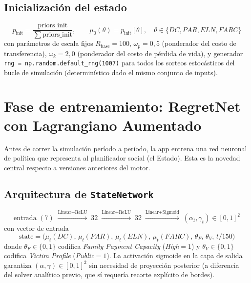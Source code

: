 \documentclass[ecta,nameyear,draft]{econsocart}
\newcommand{\pyvar}[1]{\texttt{#1}}
\begin{document}
\subsection{Inicialización del estado}

\begin{equation}
p_{\mathrm{init}} = \frac{\mathrm{priors\_init}}{\sum \mathrm{priors\_init}},
\qquad
\mu_0(\theta) = p_{\mathrm{init}}[\theta], \quad \theta \in \{DC, PAR, ELN, FARC\}
\end{equation}
con parámetros de escala fijos $R_{\mathrm{base}}=100$, $\omega_p = 0{,}5$ (ponderador del
costo de transferencia), $\omega_k = 2{,}0$ (ponderador del costo de pérdida de vida), y
generador \texttt{rng = np.random.default\_rng(1007)} para todos los sorteos estocásticos del
bucle de simulación (determinístico dado el mismo conjunto de inputs).

\section{Fase de entrenamiento: RegretNet con Lagrangiano Aumentado}\label{sec:training}

Antes de correr la simulación período a período, la app entrena una red neuronal de política
que representa al planificador social (el Estado). Esta es la novedad central respecto a
versiones anteriores del motor.

\subsection{Arquitectura de \pyvar{StateNetwork}}

\begin{equation}
\text{entrada } (7) \;\xrightarrow{\text{Linear+ReLU}}\; 32 \;\xrightarrow{\text{Linear+ReLU}}\; 32 \;\xrightarrow{\text{Linear+Sigmoid}}\; (\alpha_t, \gamma_t) \in [0,1]^2
\end{equation}
con vector de entrada
\begin{equation}
\text{state} = \bigl(\mu_t(DC),\, \mu_t(PAR),\, \mu_t(ELN),\, \mu_t(FARC),\, \theta_F,\, \theta_V,\, t/150\bigr)
\end{equation}
donde $\theta_F \in \{0,1\}$ codifica \emph{Family Payment Capacity} (\emph{High}$=1$) y
$\theta_V \in \{0,1\}$ codifica \emph{Victim Profile} (\emph{Public}$=1$). La activación
sigmoide en la capa de salida garantiza $(\alpha,\gamma) \in [0,1]^2$ sin necesidad de
proyección posterior (a diferencia del solver analítico previo, que sí requería recorte
explícito de bordes).
\end{document}
